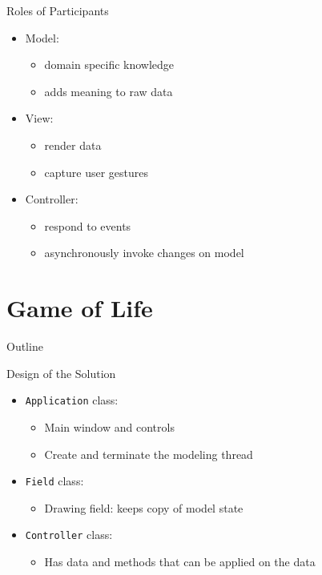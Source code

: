 \begin{frame}{Roles of Participants}
  \begin{itemize}
  \item Model:
    \begin{itemize}
    \item domain specific knowledge
    \item adds meaning to raw data
    \end{itemize}
  \item View:
    \begin{itemize}
    \item render data
    \item capture user gestures
    \end{itemize}
  \item Controller:
    \begin{itemize}
    \item respond to events 
    \item asynchronously invoke changes on model
    \end{itemize}
  \end{itemize}
\end{frame}

\section{Game of Life}

\begin{frame}{Outline}
  \tableofcontents[current]
\end{frame}

\begin{frame}{Design of the Solution}
  \begin{itemize}
  \item \lstinline!Application! class:
    \begin{itemize}
    \item Main window and controls
    \item Create and terminate the modeling thread
    \end{itemize}
  \item \lstinline!Field! class:
    \begin{itemize}
    \item Drawing field: keeps copy of model state
    \end{itemize}
  \item \lstinline!Controller! class:
    \begin{itemize}
    \item Has data and methods that can be applied on the data
    \end{itemize}
  \end{itemize}
\end{frame}


